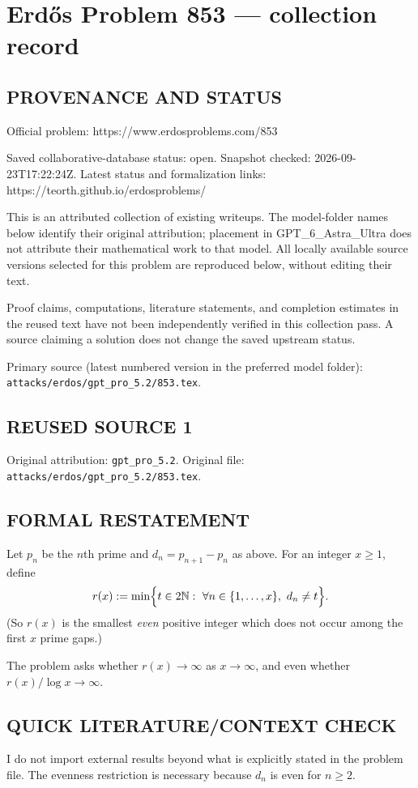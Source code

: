 \section*{Erd\H{o}s Problem 853 --- collection record}

\subsection*{PROVENANCE AND STATUS}
Official problem: https://www.erdosproblems.com/853

Saved collaborative-database status: open.
Snapshot checked: 2026-09-23T17:22:24Z.
Latest status and formalization links: https://teorth.github.io/erdosproblems/

This is an attributed collection of existing writeups. The model-folder names below identify their original attribution; placement in GPT\_6\_Astra\_Ultra does not attribute their mathematical work to that model. All locally available source versions selected for this problem are reproduced below, without editing their text.

Proof claims, computations, literature statements, and completion estimates in the reused text have not been independently verified in this collection pass. A source claiming a solution does not change the saved upstream status.

Primary source (latest numbered version in the preferred model folder): \texttt{attacks/erdos/gpt\_pro\_5.2/853.tex}.

\subsection*{REUSED SOURCE 1}
Original attribution: \texttt{gpt\_pro\_5.2}.
Original file: \texttt{attacks/erdos/gpt\_pro\_5.2/853.tex}.


\subsection*{FORMAL RESTATEMENT}
Let $p_n$ be the $n$th prime and $d_n=p_{n+1}-p_n$ as above. For an integer $x\ge 1$, define
\[
  r(x):= \min\Bigl\{ t\in 2\mathbb{N}:\ \forall n\in\{1,\dots,x\},\ d_n\ne t\Bigr\}.
\]
(So $r(x)$ is the smallest \emph{even} positive integer which does not occur among the first $x$ prime gaps.)

The problem asks whether $r(x)\to\infty$ as $x\to\infty$, and even whether $r(x)/\log x\to\infty$.

\subsection*{QUICK LITERATURE/CONTEXT CHECK}
I do not import external results beyond what is explicitly stated in the problem file.  The evenness restriction is necessary because $d_n$ is even for $n\ge 2$.

